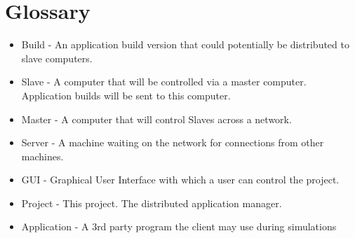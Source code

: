 \documentclass[a4paper,12pt,final]{article}
\begin{document}
\section{Glossary}
\begin{itemize}
\item{Build - An application build version that could potentially be distributed to slave computers.}
\item{Slave - A computer that will be controlled via a master computer. Application builds will be sent to this computer.}
\item{Master - A computer that will control Slaves across a network.}
\item{Server - A machine waiting on the network for connections from other machines.}
\item{GUI - Graphical User Interface with which a user can control the project.}
\item{Project - This project. The distributed application manager.}
\item{Application - A 3rd party program the client may use during simulations}
\end{itemize}
\end{document}
